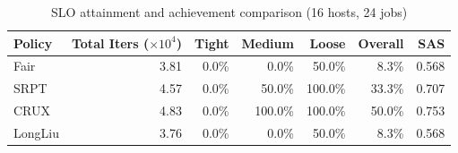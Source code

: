 \begin{table}[t]
\centering
\caption{SLO attainment and achievement comparison (16 hosts, 24 jobs)}
\label{tab:slo_16host}
\begin{tabular}{l|r|r|r|r|r|r}
\hline
Policy & Total Iters ($\times 10^4$) & Tight & Medium & Loose & Overall & SAS \\
\hline
Fair & 3.81 & 0.0\% & 0.0\% & 50.0\% & 8.3\% & 0.568 \\
SRPT & 4.57 & 0.0\% & 50.0\% & 100.0\% & 33.3\% & 0.707 \\
CRUX & 4.83 & 0.0\% & 100.0\% & 100.0\% & 50.0\% & 0.753 \\
LongLiu & 3.76 & 0.0\% & 0.0\% & 50.0\% & 8.3\% & 0.568 \\
\hline
\end{tabular}
\end{table}
